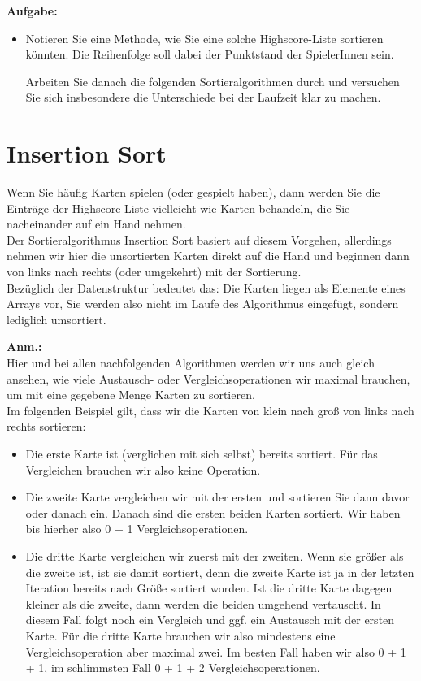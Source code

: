 \textbf{Aufgabe:}

\begin{itemize}
	\item Notieren Sie eine Methode, wie Sie eine solche Highscore-Liste sortieren könnten. Die Reihenfolge soll dabei der Punktstand der SpielerInnen sein.
	
	Arbeiten Sie danach die folgenden Sortieralgorithmen durch und versuchen Sie sich insbesondere die Unterschiede bei der Laufzeit klar zu machen.
\end{itemize}

\section{Insertion Sort}

Wenn Sie häufig Karten spielen (oder gespielt haben), dann werden Sie die Einträge der Highscore-Liste vielleicht wie Karten behandeln, die Sie nacheinander auf ein Hand nehmen.\\

Der Sortieralgorithmus Insertion Sort basiert auf diesem Vorgehen, allerdings nehmen wir hier die unsortierten Karten direkt auf die Hand und beginnen dann von links nach rechts (oder umgekehrt) mit der Sortierung.\\

Bezüglich der Datenstruktur bedeutet das: Die Karten liegen als Elemente eines Arrays vor, Sie werden also nicht im Laufe des Algorithmus eingefügt, sondern lediglich umsortiert.

\textbf{Anm.:}\\

Hier und bei allen nachfolgenden Algorithmen werden wir uns auch gleich ansehen, wie viele Austausch- oder Vergleichsoperationen wir maximal brauchen, um mit eine gegebene Menge Karten zu sortieren.\\

Im folgenden Beispiel gilt, dass wir die Karten von klein nach groß von links nach rechts sortieren:

\begin{itemize}
	\item Die erste Karte ist (verglichen mit sich selbst) bereits sortiert. Für das Vergleichen brauchen wir also keine Operation.
	\item Die zweite Karte vergleichen wir mit der ersten und sortieren Sie dann davor oder danach ein. Danach sind die ersten beiden Karten sortiert. Wir haben bis hierher also 0 + 1 Vergleichsoperationen.
	\item Die dritte Karte vergleichen wir zuerst mit der zweiten. Wenn sie größer als die zweite ist, ist sie damit sortiert, denn die zweite Karte ist ja in der letzten Iteration bereits nach Größe sortiert worden. Ist die dritte Karte dagegen kleiner als die zweite, dann werden die beiden umgehend vertauscht. In diesem Fall folgt noch ein Vergleich und ggf. ein Austausch mit der ersten Karte. Für die dritte Karte brauchen wir also mindestens eine Vergleichsoperation aber maximal zwei. Im besten Fall haben wir also 0 + 1 + 1, im schlimmsten Fall 0 + 1 + 2 Vergleichsoperationen.
\end{itemize}

